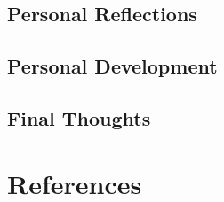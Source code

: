 \documentclass[12pt, a4paper]{article}
\begin{document}

\subsection{Personal Reflections}


\subsection{Personal Development}


\subsection{Final Thoughts}

\pagebreak


\section{References}


\end{document}
